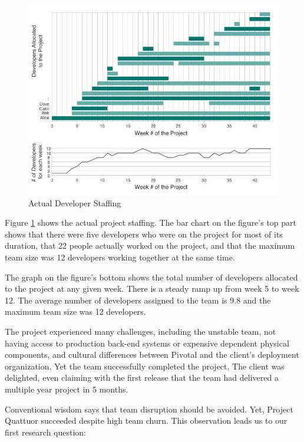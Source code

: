 \begin{figure}[t]
\centering
\includegraphics[width=7.1in]{DeveloperStaffing.jpg}
\caption{Actual Developer Staffing}
\label{DeveloperStaffing}
\end{figure}

Figure \ref{DeveloperStaffing} shows the actual project staffing.  The bar chart on the figure's top part shows that there were five developers who were on the project for most of its duration, that 22 people actually worked on the project, and that the maximum team size was 12 developers working together at the same time.

The graph on the figure's bottom shows the total number of developers allocated to the project at any given week. There is a steady ramp up from week 5 to week 12. The average number of developers assigned to the team is 9.8 and the maximum team size was 12 developers.

The project experienced many challenges, including the unstable team, not having access to production back-end systems or expensive dependent physical components, and cultural differences between Pivotal and the client's deployment organization. Yet the team successfully completed the project. The client was delighted, even claiming with the first release that the team had delivered a multiple year project in 5 months. 

Conventional wisdom says that team disruption should be avoided. Yet, Project Quattuor succeeded despite high team churn. This observation leads us to our first research question: 

